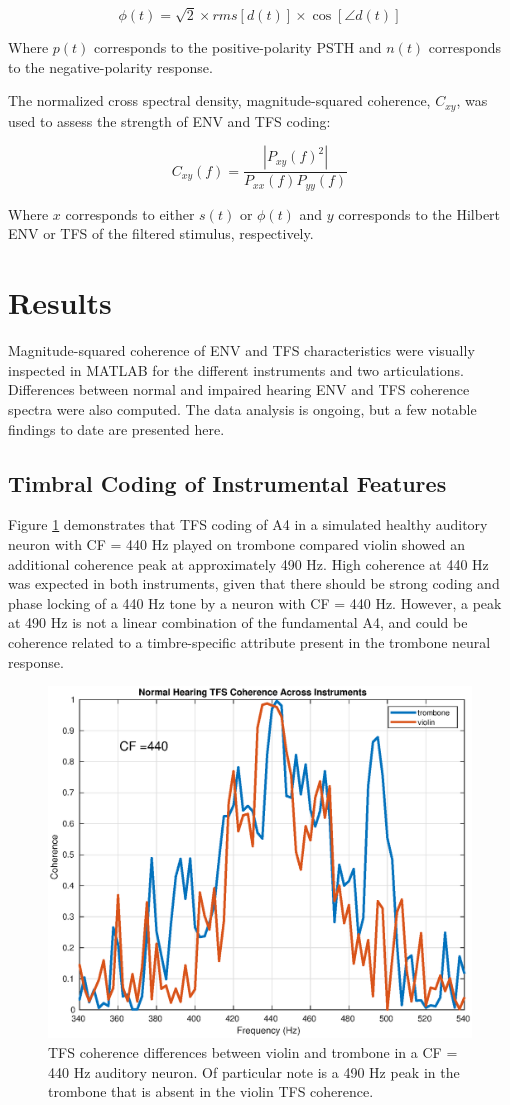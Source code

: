 \documentclass[conference]{IEEEtran}
\begin{document}
\begin{equation}
\phi (t) = \sqrt{2} \times rms[d(t)] \times \cos[\angle d(t)]
\end{equation}

Where $p(t)$ corresponds to the positive-polarity PSTH and $n(t)$ corresponds to the negative-polarity response.

The normalized cross spectral density, magnitude-squared coherence, $C_{xy}$, was used to assess the strength of ENV and TFS coding:

\begin{equation}
C_{xy}(f) = \frac{|P_{xy}(f)^2|}{P_{xx}(f)P_{yy}(f)}
\end{equation}

Where $x$ corresponds to either $s(t)$ or $\phi(t)$ and $y$ corresponds to the Hilbert ENV or TFS of the filtered stimulus, respectively. 

\section{Results}

Magnitude-squared coherence of ENV and TFS characteristics were visually inspected in MATLAB for the different instruments and two articulations. Differences between normal and impaired hearing ENV and TFS coherence spectra were also computed. The data analysis is ongoing, but a few notable findings to date are presented here. 

\subsection{Timbral Coding of Instrumental Features}

Figure \ref{tromb_viol}  demonstrates that TFS coding of A4 in a simulated healthy auditory neuron with CF = 440 Hz played on trombone compared violin showed an additional coherence peak at approximately 490 Hz. High coherence at 440 Hz was expected in both instruments, given that there should be strong coding and phase locking of a 440 Hz tone by a neuron with CF = 440 Hz. However, a peak at 490 Hz is not a linear combination of the fundamental A4, and could be coherence related to a timbre-specific attribute present in the trombone neural response. 

\begin{figure}[h]
\includegraphics[width = .5\textwidth]{trombone_violin_TFS_coherence_440}
\caption{TFS coherence differences between violin and trombone in a CF = 440 Hz auditory neuron. Of particular note is a 490 Hz peak in the trombone that is absent in the violin TFS coherence.}
\label{tromb_viol}
\end{figure} 
\end{document}
